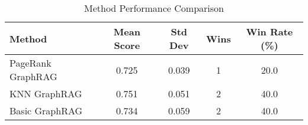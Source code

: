 \begin{table}[h]
\centering
\begin{tabular}{|l|c|c|c|c|}
\hline
Method & Mean Score & Std Dev & Wins & Win Rate (\%) \\
\hline
PageRank GraphRAG & 0.725 & 0.039 & 1 & 20.0 \\
KNN GraphRAG & 0.751 & 0.051 & 2 & 40.0 \\
Basic GraphRAG & 0.734 & 0.059 & 2 & 40.0 \\
\hline
\end{tabular}
\caption{Method Performance Comparison}
\label{tab:method_comparison}
\end{table}
